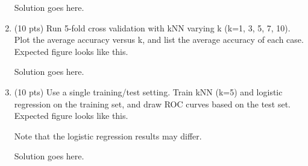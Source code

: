 \documentclass[a4paper]{article}
\theoremstyle{definition}
\newenvironment{soln}{
    \leavevmode\color{blue}\ignorespaces
}{}
\begin{document}
\begin{enumerate}
	\begin{soln}  Solution goes here. \end{soln}
	
	\item (10 pts) Run 5-fold cross validation with kNN varying k (k=1, 3, 5, 7, 10). Plot the average accuracy versus k, and list the average accuracy of each case. \\
	Expected figure looks like this.
	\begin{figure}[h]
		\centering
	\end{figure}
	
	\begin{soln}  Solution goes here. \end{soln}
	
	\item (10 pts) Use a single training/test setting. Train kNN (k=5) and logistic regression on the training set, and draw ROC curves based on the test set. \\
	Expected figure looks like this.
	\begin{figure}[h]
		\centering
	\end{figure}
	Note that the logistic regression results may differ.
	
	\begin{soln}  Solution goes here. \end{soln}
	
\end{enumerate}

\end{document}
